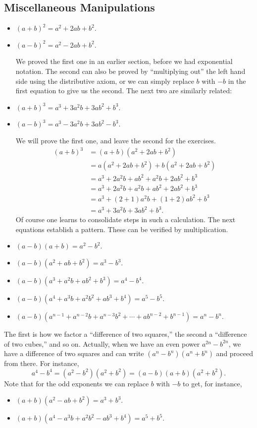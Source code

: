\subsection{Miscellaneous Manipulations}

\begin{itemize}
\item $(a+b)^2=a^2+2ab+b^2$.
\item $(a-b)^2=a^2-2ab+b^2$.

We proved the first one in an earlier section, before we had exponential
notation.  The second can also be proved by ``multiplying out''
the left hand side using the distributive axiom, or 
we can simply replace $b$ with $-b$ in the first equation to 
give us the second.  The next two are similarly related:
\item $(a+b)^3=a^3+3a^2b+3ab^2+b^3$.
\item $(a-b)^3=a^3-3a^2b+3ab^2-b^3$.

We will prove the first one, and leave the second for the
exercises.
\begin{align*}
(a+b)^3&=(a+b)(a^2+2ab+b^2)\\
	&=a(a^2+2ab+b^2)+b(a^2+2ab+b^2)\\
	&=a^3+2a^2b+ab^2+a^2b+2ab^2+b^3\\
	&=a^3+2a^2b+a^2b+ab^2+2ab^2+b^3\\
	&=a^3+(2+1)a^2b+(1+2)ab^2+b^3\\
	&=a^3+3a^2b+3ab^2+b^3. \end{align*}
Of course one learns to consolidate steps in such a calculation.
The next equations establish a pattern.  These 
can be  verified by multiplication.\footnotemark
{}
\item $(a-b)(a+b)=a^2-b^2$.
\item $(a-b)(a^2+ab+b^2)=a^3-b^3$.
\item $(a-b)(a^3+a^2b+ab^2+b^3)=a^4-b^4$.
\item $(a-b)(a^4+a^3b+a^2b^2+ab^3+b^4)=a^5-b^5$.
\item $(a-b)(a^{n-1}+a^{n-2}b+a^{n-3}b^2+\cdots
+ab^{n-2}+b^{n-1})=a^n-b^n$.\label{aN-bN}
\end{itemize}
The first is how we factor a ``difference of two squares,''
the second a ``difference of two cubes,'' and so on.
Actually, when we have an even power
$a^{2n}-b^{2n}$,  we have a difference
of two squares and can write $(a^n-b^n)(a^n+b^n)$
and proceed from there.  For instance,
$$a^4-b^4=(a^2-b^2)(a^2+b^2)
=(a-b)(a+b)(a^2+b^2).$$
Note that for the odd exponents we can replace $b$
with $-b$ to get, for instance,
\begin{itemize}
\item $(a+b)(a^2-ab+b^2)=a^3+b^3$.
\item $(a+b)(a^4-a^3b+a^2b^2-ab^3+b^4)=a^5+b^5$.
\end{itemize}
